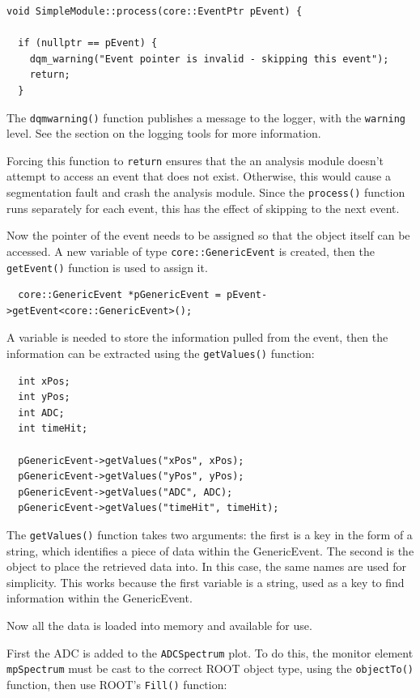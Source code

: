 \begin{lstlisting}
void SimpleModule::process(core::EventPtr pEvent) {

  if (nullptr == pEvent) {
    dqm_warning("Event pointer is invalid - skipping this event");
    return;
  }
\end{lstlisting}

The \texttt{dqm\textunderscore warning()} function publishes a message to the logger, with the \texttt{warning} level. See the section on the logging tools for more information.

Forcing this function to \texttt{return} ensures that the an analysis module doesn't attempt to access an event that does not exist. Otherwise, this would cause a segmentation fault and crash the analysis module. Since the \texttt{process()} function runs separately for each event, this has the effect of skipping to the next event.

Now the pointer of the event needs to be assigned so that the object itself can be accessed. A new variable of type \texttt{core::GenericEvent} is created, then the \texttt{getEvent()} function is used to assign it.

\begin{lstlisting}
  core::GenericEvent *pGenericEvent = pEvent->getEvent<core::GenericEvent>();
\end{lstlisting}

A variable is needed to store the information pulled from the event, then the information can be extracted using the \texttt{getValues()} function:

\begin{lstlisting}
  int xPos;
  int yPos;
  int ADC;
  int timeHit;

  pGenericEvent->getValues("xPos", xPos);
  pGenericEvent->getValues("yPos", yPos);
  pGenericEvent->getValues("ADC", ADC);
  pGenericEvent->getValues("timeHit", timeHit);
\end{lstlisting}

The \texttt{getValues()} function takes two arguments: the first is a key in the form of a string, which identifies a piece of data within the GenericEvent. The second is the object to place the retrieved data into. In this case, the same names are used for simplicity. This works because the first variable is a string, used as a key to find information within the GenericEvent.

Now all the data is loaded into memory and available for use. 

First the ADC is added to the \texttt{ADC\textunderscore Spectrum} plot. To do this, the monitor element \texttt{m\textunderscore pSpectrum} must be cast to the correct ROOT object type, using the \texttt{objectTo()} function, then use ROOT's \texttt{Fill()} function:

